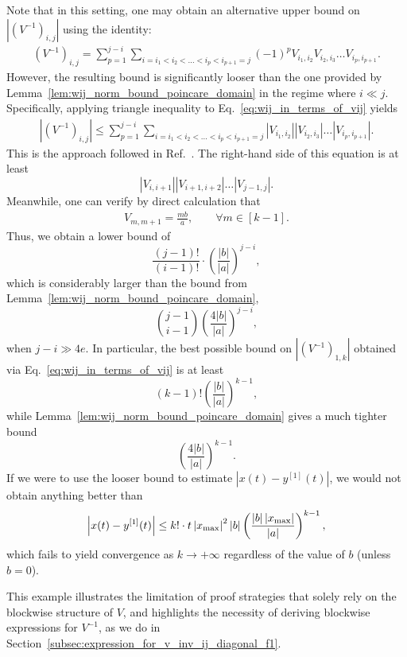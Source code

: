 \documentclass[superscriptaddress,onecolumn,nofootinbib,longbibliography,a4paper,accepted=2026-09-29]{quantumarticle}
\theoremstyle{plain}
\theoremstyle{definition}
\numberwithin{thm}{section}
\numberwithin{assumption}{section}
\numberwithin{lemma}{section}
\numberwithin{prop}{section}
\numberwithin{cor}{section}
\numberwithin{definition}{section}
\numberwithin{rmk}{section}
\numberwithin{equation}{section}
\newcommand{\abs}[1]      {\left| #1 \right|}
\newcommand{\lrb}[1]{\left ( #1 \right )}
\begin{document}
Note that in this setting, one may obtain an alternative upper bound on $\abs{(V^{-1})_{i,j}}$  using the identity: 
\begin{align}
({V}^{-1})_{i,j} = \sum_{p=1}^{j-i} \sum_{{i=i_1}<i_2<\dots<i_p<{i_{p+1}=j}} (-1)^p {V}_{{i_1},i_2}{V}_{i_2,i_3}\dots {V}_{i_p,{i_{p+1}}}.
\label{eq:wij_in_terms_of_vij}
\end{align}
However, the resulting bound is significantly looser than the one provided by Lemma~\ref{lem:wij_norm_bound_poincare_domain} in the regime where $i \ll j$. Specifically, applying triangle inequality to Eq.~\eqref{eq:wij_in_terms_of_vij} yields
\begin{align}
\abs{({V}^{-1})_{i,j}} \le \sum_{p=1}^{j-i} \sum_{{i=i_1}<i_2<\dots<i_p<{i_{p+1}=j}} \abs{{V}_{{i_1},i_2}}\abs{{V}_{i_2,i_3}}\dots \abs{{V}_{i_p,{i_{p+1}}}}.
\end{align}
This is the approach followed in Ref.~\cite{wu2024quantum}. The right-hand side of this equation is at least 
$$\abs{{V}_{i,i+1}}\abs{{V}_{i+1,i+2}}\dots \abs{{V}_{j-1,j}}.$$ 
Meanwhile, one can verify by direct calculation that
\begin{align}
V_{m,m+1}=\frac{mb}{a}, \qquad \forall m \in [k-1].
\end{align}
Thus, we obtain a lower bound of
$$\frac{(j-1)!}{(i-1)!} \cdot \lrb{\frac{\abs{b}}{\abs{a}}}^{j-i},$$
which is considerably larger than the bound from Lemma~\ref{lem:wij_norm_bound_poincare_domain},
$$\binom{j-1}{i-1}\lrb{\frac{4\abs{b}}{\abs{a}}}^{j-i},$$
when $j-i \gg 4e$. In particular, the best possible bound on $\abs{(V^{-1})_{1,k}}$ obtained via Eq.~\eqref{eq:wij_in_terms_of_vij}
is at least 
$$(k-1)! \lrb{\frac{\abs{b}}{\abs{a}}}^{k-1},$$
while Lemma~\ref{lem:wij_norm_bound_poincare_domain} gives a much tighter bound
$$ \lrb{\frac{4\abs{b}}{\abs{a}}}^{k-1}.$$
If we were to use the looser bound to estimate $\abs{x(t)-y^{[1]}(t)}$, we would not obtain anything better than
\begin{align}
    \abs{x(t)-y^{[1]}(t)} \le k! \cdot t \abs{x_{\rm max}}^{2} \abs{b} \lrb{\frac{\abs{b}\abs{x_{\rm max}}}{\abs{a}}}^{k-1},
\end{align}
which fails to yield convergence as $k \to +\infty$
regardless of the value of $b$ (unless $b=0$). 

This example illustrates the limitation of proof strategies that solely rely on the blockwise structure of $V$, and highlights the necessity of deriving blockwise expressions for $V^{-1}$, as we do in Section~\ref{subsec:expression_for_v_inv_ij_diagonal_f1}.
\end{document}
